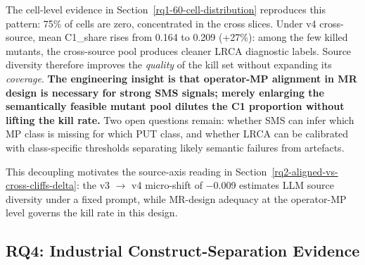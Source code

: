 \documentclass[manuscript,screen,review]{acmart}
\begin{document}
The cell-level evidence in Section~\ref{rq1-60-cell-distribution} reproduces this pattern: 75\% of cells
are zero, concentrated in the cross slices. Under v4 cross-source, mean
C1\_share rises from 0.164 to 0.209 (+27\%): among the few killed
mutants, the cross-source pool produces cleaner LRCA diagnostic labels.
Source diversity therefore improves the \emph{quality} of the kill set
without expanding its \emph{coverage}. \textbf{The engineering insight is that
operator-MP alignment in MR design is necessary for strong SMS signals;
merely enlarging the semantically feasible mutant pool dilutes the C1
proportion without lifting the kill rate.} Two open questions remain:
whether SMS can infer which MP class is missing for which PUT class, and
whether LRCA can be calibrated with class-specific thresholds separating
likely semantic failures from artefacts.

This decoupling motivates the source-axis reading in Section~\ref{rq2-aligned-vs-cross-cliffs-delta}: the v3 $\to$
v4 micro-shift of $-$0.009 estimates LLM source diversity under a fixed
prompt, while MR-design adequacy at the operator-MP level governs the
kill rate in this design.

\subsection{RQ4: Industrial Construct-Separation Evidence}\label{rq4-industrial-construct-separation}
\end{document}
